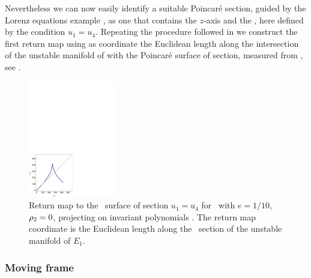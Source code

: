 Nevertheless we can now easily identify a suitable Poincar\'e section, guided
by the Lorenz equations example , as one that contains the $z$-axis and the \reqv,
here defined by the condition $u_1=u_4$. Repeating the procedure followed in 
we construct the first return map using as coordinate the Euclidean length along the intersection
of the unstable manifold of  with the Poincar\'e surface of section, measured from , see .


\begin{figure}[ht]
\begin{center}
\includegraphics[width=0.35\textwidth]{../figs/CLEipRM}
\end{center}
\caption[Return map for Complex Lorenz flow, invariant polynomials]{Return map to the \Poincare\
surface of section $u_1=u_4$ for \CLe\ with $e=1/10$, $\rho_2=0$,
projecting on invariant polynomials \refeq{eq:ipLaser}.
The return map coordinate is the Euclidean
length along the \Poincare\ section of the unstable manifold of $E_1$.
    }
\label{fig:CLEipRM}
\end{figure}

\subsubsection{Moving frame}
\label{sec:CLeMF}


